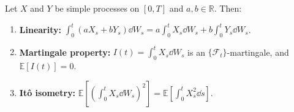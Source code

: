 \begin{proposition}
\label{prop:ito-simple-props}
Let $X$ and $Y$ be simple processes on $[0, T]$ and $a, b \in \mathbb{R}$. Then:
\begin{enumerate}
    \item \textbf{Linearity:} $\int_0^t (a X_s + b Y_s)\dd W_s = a \int_0^t X_s \dd W_s + b \int_0^t Y_s \dd W_s$.
    \item \textbf{Martingale property:} $I(t) = \int_0^t X_s \dd W_s$ is an $\{\mathcal{F}_t\}$-martingale, and $\mathbb{E}[I(t)] = 0$.
    \item \textbf{It\^o isometry:} $\mathbb{E}\left[\left(\int_0^t X_s \dd W_s\right)^2\right] = \mathbb{E}\left[\int_0^t X_s^2 \dd s\right]$.
\end{enumerate}
\end{proposition}
